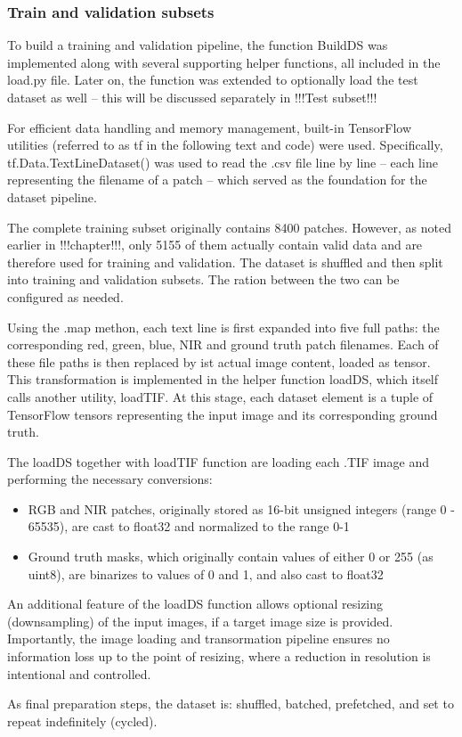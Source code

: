 {\subsubsection{Train and validation subsets}

To build a training and validation pipeline, the function BuildDS was implemented along with several supporting helper functions, all included in the load.py file. Later on, the function was extended to optionally load the test dataset as well – this will be discussed separately in !!!Test subset!!!

For efficient data handling and memory management, built-in TensorFlow utilities (referred to as tf in the following text and code) were used. Specifically, tf.Data.TextLineDataset() was used to read the .csv file line by line – each line representing the filename of a patch – which served as the foundation for the dataset pipeline.

The complete training subset originally contains 8400 patches. However, as noted earlier in !!!chapter!!!, only 5155 of them actually contain valid data and are therefore used for training and validation. The dataset is shuffled and then split into training and validation subsets. The ration between the two can be configured as needed.

Using the .map methon, each text line is first expanded into five full paths: the corresponding red, green, blue, NIR and ground truth patch filenames. Each of these file paths is then replaced by ist actual image content, loaded as tensor. This transformation is implemented in the helper function loadDS, which itself calls another utility, loadTIF. At this stage, each dataset element is a tuple of TensorFlow tensors representing the input image and its corresponding ground truth.

The loadDS together with loadTIF function are loading each .TIF image and performing the necessary conversions:

\begin{itemize}
    \item RGB and NIR patches, originally stored as 16-bit unsigned integers (range 0 - 65535), are cast to float32 and normalized to the range 0-1
    \item Ground truth masks, which originally contain values of either 0 or 255 (as uint8), are binarizes to values of 0 and 1, and also cast to float32
\end{itemize}

An additional feature of the loadDS function allows optional resizing (downsampling) of the input images, if a target image size is provided. Importantly, the image loading and transormation pipeline ensures no information loss up to the point of resizing, where a reduction in resolution is intentional and controlled.

As final preparation steps, the dataset is: shuffled, batched, prefetched, and set to repeat indefinitely (cycled).


}